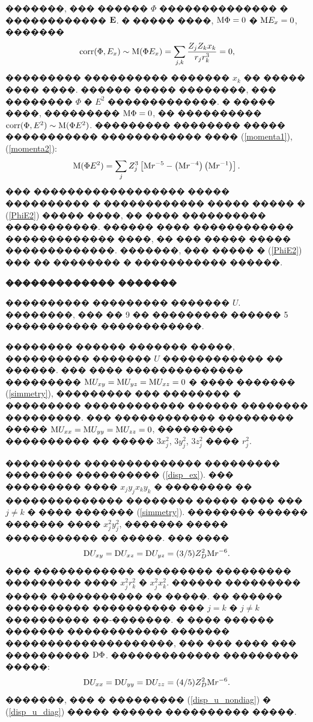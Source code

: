 \documentclass[12pt,titlepage]{article}
\newcommand\M{{\rm M}} %
\newcommand\D{{\rm D}}
\begin{document}
�������, ��� ������ $\Phi$ �������������� � ������������ ${\bf E}$. � ����� ����, $\M \Phi = 0$ � $\M E_x = 0$, �������
\begin{equation}
    {\rm corr} (\Phi, E_x) \sim \M (\Phi E_x) = \sum_{j,k} \frac{Z_j Z_k x_k}{r_j r_k^3} = 0,
\end{equation}
��������� ���������� ������� $x_k$ �� ����� ���� ����. ������ ����� ��������, ��� �������� $\Phi$ � $E^2$ �������������. � ����� ����, ��������� $\M \Phi = 0$, �� ���������� ${\rm corr} (\Phi,E^2) \sim \M (\Phi E^2)$. ��������� �������� ����� ����������� ������������ ���� (\ref{momenta1}), (\ref{momenta2}):
\begin{equation}
    \label{PhiE2}
    \M (\Phi E^2) = \sum_j Z_j^3 \left[ \M r^{-5} - \left(\M r^{-4}\right) \left(\M r^{-1}\right) \right].
\end{equation}
��� ������������������ ����� ���������� � ������������ ����� ����� � (\ref{PhiE2}) ����� ����, �� ���� ���������� �����������. ������ ���� ������������ ������������� ����, �� ��� ����� ����� �������������. �������, ��� ����� � (\ref{PhiE2}) ��� �� �������� � ����������� ������.

\bigskip
\textbf{������������� �������}

���������� ��������� ������� $U$. ��������, ��� �� 9 �� ��������� ������ 5 ����������� ������������.

�������� ������ ������� �����, ���������� ������� $U$ ������������ �� ������. ��� ���� �������������� ��������� $\M U_{xy} = \M U_{yz} = \M U_{xz} = 0$ � ���� ������� (\ref{simmetry}), ��������� ��� �������� � ��������� ������������ ������ �������� ���������. ��� ������������ ��������� ����� $\M U_{xx} = \M U_{yy} = \M U_{zz} = 0$, ��������� ���������� �� ����� $3x_j^2$, $3y_j^2$, $3z_j^2$ ���� $r_j^2$.

��������� �������������� ��������� �������� ���������� (\ref{disp_ex}). ��� ��������� ���� $x_j y_j x_k y_k$ � �������� �� �������������� �������� ����� ���� ��� $j \not= k$ � ���� ������� (\ref{simmetry}). �������� ������ ������� ���� $x_j^2 y_j^2$, ������� ����� ����������� �� �����. ��� ����
\begin{gather}
    \label{disp_u_nondiag}
    \D U_{xy} = \D U_{xz} = \D U_{yz} = (3/5) Z_D^2 \M r^{-6}.
\end{gather}
��� ������������ ��������� ��������� ��������� ���� $x_j^2 r_k^2$ � $x_j^2 x_k^2$. ������ ��������� ����� ����������� �� �����. �� ������ ���������� ���������� ��� $j = k$ � $j \not= k$ ���������� ��-�������. � ���� ������ ������� ������������ ������� ��������������������, ��� ��� ���� ��� ���������� $\D \Phi$. ������������� ��������� �����:
\begin{equation}
    \label{disp_u_diag} %
    \D U_{xx} = \D U_{yy} = \D U_{zz} = (4/5) Z_D^2 \M r^{-6}.
\end{equation}
�������, ��� � ��������� (\ref{disp_u_nondiag}) � (\ref{disp_u_diag}) ����� ������ ���������� �����.
\end{document}
